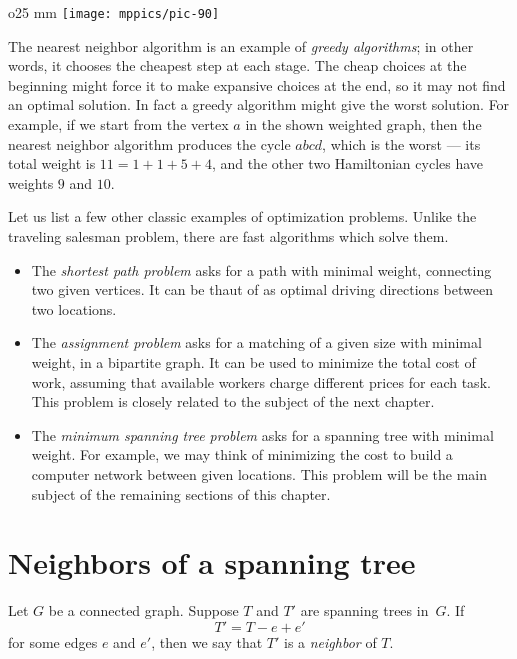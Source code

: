 \begin{wrapfigure}{o}{25 mm}
\vskip-0mm
\centering
\texttt{[image: mppics/pic-90]}
\end{wrapfigure}

The nearest neighbor algorithm is an example of \emph{greedy algorithms};
in other words, it chooses the cheapest step at each stage.
The cheap choices at the beginning might force it to make expansive choices at the end,
so it may not find an optimal solution. 
In fact a greedy algorithm might give the worst solution.
For example, if we start from the vertex $a$ in the shown weighted graph, then the nearest neighbor algorithm produces the cycle $abcd$, which is the worst --- its total weight is $11=1+1+5+4$, and the other two  Hamiltonian cycles have weights $9$ and $10$.

Let us list a few other classic examples of optimization problems.
Unlike the traveling salesman problem, there are fast algorithms which solve them.
\begin{itemize}
\item The \emph{shortest path problem} asks for a path with minimal weight, connecting two given vertices.
It can be thaut of as optimal driving directions between two locations.
\item The \label{assignment problem}\emph{assignment problem} asks for a matching of a given size with minimal weight, in a bipartite graph.
It can be used to minimize the total cost of work, assuming that available workers charge different prices for each task.
This problem is closely related to the subject of the next chapter.
\item The \emph{minimum spanning tree problem} asks for a spanning tree with minimal weight.
For example, we may think of minimizing the cost to build a computer network between given locations.
This problem will be the main subject of the remaining sections of this chapter.
\end{itemize}


\section{Neighbors of a spanning tree}

Let $G$ be a connected graph.
Suppose $T$ and $T'$ are spanning trees in~$G$.
If 
\[T'=T-e+e'\]
for some edges $e$ and $e'$,
then we say that $T'$ is a \emph{neighbor} of $T$.

